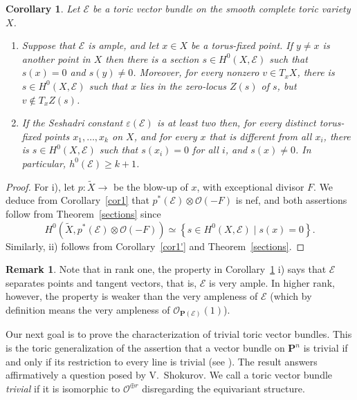 \documentclass[12pt]{amsart}
\newtheorem{corollary}[lemma]{Corollary}
\theoremstyle{definition}
\newtheorem{remark}[lemma]{Remark}
\theoremstyle{remark}
\begin{document}
\bigskip
\begin{corollary}\label{cor3}
Let ${\mathcal{E}}$ be a toric vector bundle on the smooth complete toric
variety $X$.
\begin{enumerate}
\item[i)] Suppose that ${\mathcal{E}}$ is ample, and let $x\in X$ be a torus-fixed
point. If $y\neq x$ is another point in $X$ then there is a section $s\in
H^0(X,{\mathcal{E}})$ such that $s(x)=0$ and $s(y)\neq 0$. Moreover, for every
nonzero $v\in T_xX$, there is $s\in H^0(X,{\mathcal{E}})$ such that $x$ lies
in the zero-locus $Z(s)$ of $s$, but $v\not\in T_xZ(s)$.
\item[ii)] If the Seshadri constant ${\varepsilon}({\mathcal{E}})$ is at least two then, for every distinct torus-fixed points
$x_1,\ldots,x_k$ on $X$, and for every $x$ that is different from
all $x_i$, there is $s\in H^0(X,{\mathcal{E}})$ such that $s(x_i)=0$ for all
$i$, and $s(x)\neq 0$. In particular, $h^0({\mathcal{E}})\geq k+1$.
\end{enumerate}
\end{corollary}

\begin{proof}
For i), let $p\colon \widetilde{X}{\xrightarrow{\ \ }}$ be the blow-up of $x$, with
exceptional divisor $F$. We deduce from Corollary~\ref{cor1} that
$p^*({\mathcal{E}})\otimes {\mathcal{O}}(-F)$ is nef, and both assertions follow from
Theorem~\ref{sections} since
$$H^0(\widetilde{X},p^*({\mathcal{E}})\otimes {\mathcal{O}}(-F))\simeq \left\{s\in H^0(X,{\mathcal{E}})\mid
s(x)=0\right\}.$$ Similarly, ii) follows from
Corollary~\ref{cor1'} and Theorem~\ref{sections}.
\end{proof}

\begin{remark}
Note that in rank one, the property in Corollary~\ref{cor3} i) says that ${\mathcal{E}}$ separates
points and tangent vectors, that is, ${\mathcal{E}}$ is very ample. In higher rank, however, the property
is weaker than the very ampleness of ${\mathcal{E}}$ (which by definition means the very
ampleness of ${\mathcal{O}}_{{{\mathbf P}}({\mathcal{E}})}(1)$).
\end{remark}

\bigskip

Our next goal is to prove the characterization of trivial toric
vector bundles. This is the toric generalization of the assertion
that a vector bundle on ${{\mathbf P}}^n$ is trivial if and only if its
restriction to every line is trivial (see \cite[Theorem 3.2.1]{OSS}). The result answers affirmatively a question posed by
V.~Shokurov. We call a toric vector bundle \emph{trivial} if it is
isomorphic to ${\mathcal{O}}^{\oplus r}$ disregarding the equivariant
structure.
\end{document}
